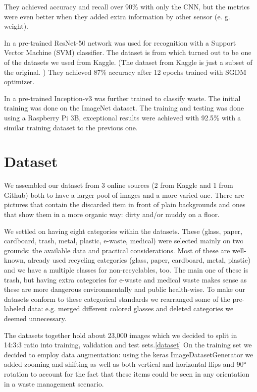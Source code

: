 \documentclass[twocolumn]{article}
\begin{document}
	They achieved accuracy and recall over 90\% with only the CNN, but the metrics were even better when they added extra information by other sensor (e. g. weight).
	
	In \cite{ADEDEJI2019607} a pre-trained ResNet-50 \cite{DBLP:journals/corr/HeZRS15}
	network was used for recognition with a Support Vector Machine (SVM) classifier. The dataset is from \cite{yang2016classification} which turned out to be one of the datasets we used from Kaggle. (The dataset from Kaggle is just a subset of the original. \cite{cchangcs_2018}) They achieved 87\% accuracy after 12 epochs trained with SGDM optimizer.
	
	In \cite{10.1145/3417473.3417474} a pre-trained Inception-v3 was further trained to classify waste. The initial training was done on the ImageNet \cite{5206848} dataset. The training and testing was done using a Raspberry Pi 3B, exceptional results were achieved with 92.5\% with a similar training dataset to the previous one.
	
	\section{Dataset}
	We assembled our dataset from 3 online sources (2 from Kaggle and 1 from Github) both to have a larger pool of images and a more varied one. There are pictures that contain the discarded item in front of plain backgrounds and ones that show them in a more organic way: dirty and/or muddy on a floor. 
	
	We settled on having eight categories within the datasets. These (glass, paper, cardboard, trash, metal, plastic, e-waste, medical) were selected mainly on two grounds: the available data and practical considerations. Most of these are well-known, already used recycling categories (glass, paper, cardboard, metal, plastic) and we have a multiple classes for non-recyclables, too. The main one of these is trash, but having extra categories for e-waste and medical waste makes sense as these are more dangerous environmentally and public health-wise. To make our datasets conform to these categorical standards we rearranged some of the pre-labeled data: e.g. merged different colored glasses and deleted categories we deemed unnecessary.
	
	The datasets together hold about 23,000 images which we decided to split in 14:3:3 ratio into training, validation and test sets.\ref{dataset} On the training set we decided to employ data augmentation: using the keras ImageDatasetGenerator we added zooming and shifting as well as both vertical and horizontal flips and 90° rotation to account for the fact that these items could be seen in any orientation in a waste management scenario.
	
\end{document}
